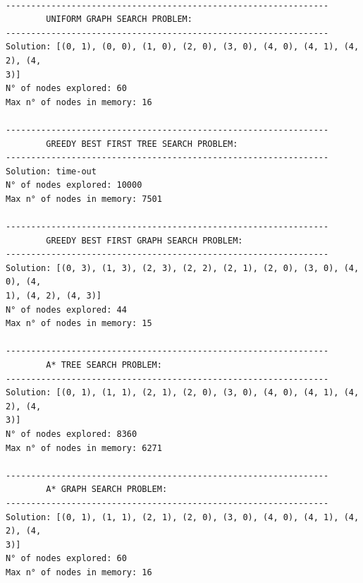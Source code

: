 \documentclass[11pt,oneside]{book}
\begin{document}
    \begin{Verbatim}[commandchars=\\\{\}]

----------------------------------------------------------------
        UNIFORM GRAPH SEARCH PROBLEM:
----------------------------------------------------------------
Solution: [(0, 1), (0, 0), (1, 0), (2, 0), (3, 0), (4, 0), (4, 1), (4, 2), (4,
3)]
N° of nodes explored: 60
Max n° of nodes in memory: 16

----------------------------------------------------------------
        GREEDY BEST FIRST TREE SEARCH PROBLEM:
----------------------------------------------------------------
Solution: time-out
N° of nodes explored: 10000
Max n° of nodes in memory: 7501

----------------------------------------------------------------
        GREEDY BEST FIRST GRAPH SEARCH PROBLEM:
----------------------------------------------------------------
Solution: [(0, 3), (1, 3), (2, 3), (2, 2), (2, 1), (2, 0), (3, 0), (4, 0), (4,
1), (4, 2), (4, 3)]
N° of nodes explored: 44
Max n° of nodes in memory: 15

----------------------------------------------------------------
        A* TREE SEARCH PROBLEM:
----------------------------------------------------------------
Solution: [(0, 1), (1, 1), (2, 1), (2, 0), (3, 0), (4, 0), (4, 1), (4, 2), (4,
3)]
N° of nodes explored: 8360
Max n° of nodes in memory: 6271

----------------------------------------------------------------
        A* GRAPH SEARCH PROBLEM:
----------------------------------------------------------------
Solution: [(0, 1), (1, 1), (2, 1), (2, 0), (3, 0), (4, 0), (4, 1), (4, 2), (4,
3)]
N° of nodes explored: 60
Max n° of nodes in memory: 16
    \end{Verbatim}
\end{document}

